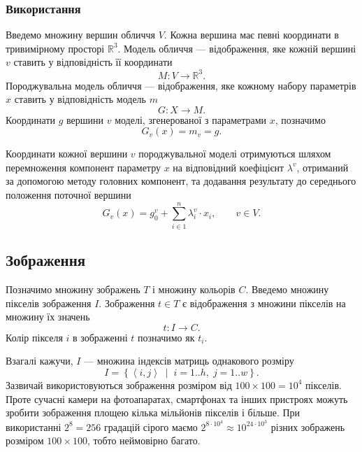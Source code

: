 \subsubsection{Використання}

Введемо множину вершин обличчя $V$.
Кожна вершина має певні координати в тривимірному просторі $\mathbb{R}^3$.
Модель обличчя --- відображення,
яке кожній вершині $v$ ставить у відповідність її координати
\begin{equation*}
  M: V \rightarrow \mathbb{R}^3.
\end{equation*}
Породжувальна модель обличчя --- відображення,
яке кожному набору параметрів $x$ ставить у відповідність модель $m$
\begin{equation*}
  G: X \rightarrow M.
\end{equation*}
Координати $g$ вершини $v$ моделі, згенерованої з параметрами $x$, позначимо
\begin{equation*}
  G_v\left( x \right) = m_v = g.
\end{equation*}

Координати кожної вершини $v$ породжувальної моделі отримуються шляхом
перемноження компонент параметру $x$ на відповідний коефіцієнт $\lambda^v$,
отриманий за допомогою методу головних компонент,
та додавання результату до середнього положення поточної вершини
\begin{equation*}
  G_v\left( x \right) = g_0^v + \sum_{i \in 1}^n \lambda_i^v \cdot x_i,
  \qquad v \in V.
\end{equation*}

\subsection{Зображення}

Позначимо множину зображень $T$ і множину кольорів $C$.
Введемо множину пікселів зображення $I$.
Зображення $t \in T$ є відображення з множини пікселів на множину їх значень
\begin{equation*}
  t: I \rightarrow C.
\end{equation*}
Колір пікселя $i$ в зображенні $t$ позначимо як $t_i$.

Взагалі кажучи, $I$ --- множина індексів матриць однакового розміру
\begin{equation*}
  I = \left\{ \left\langle i, j \right\rangle
    \;\middle|\; i = 1..h,\; j = 1..w \right\}.
\end{equation*}
Зазвичай використовуються зображення розміром від
$100 \times 100 = 10^4$ пікселів.
Проте сучасні камери на фотоапаратах, смартфонах та інших пристроях
можуть зробити зображення площею кілька мільйонів пікселів і більше.
При використанні $2^8 = 256$ градацій сірого маємо
$2^{8 \cdot 10^4} \approx 10^{24 \cdot 10^3}$
різних зображень розміром $100 \times 100$, тобто неймовірно багато.

